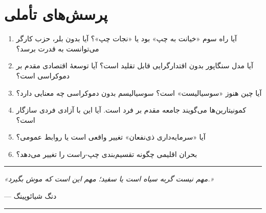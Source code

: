 \section*{پرسش‌های تأملی}

\begin{tcolorbox}[
    enhanced,
    colback=centergreen!8,
    colframe=centergreen,
    boxrule=1.5pt,
    arc=5pt,
    fonttitle=\bfseries,
    title={\rl{❓ پرسش‌هایی برای تأمل و بحث}}
]
\begin{enumerate}
    \item آیا راه سوم «خیانت به چپ» بود یا «نجات چپ»؟ آیا بدون بلر، حزب کارگر می‌توانست به قدرت برسد؟
    
    \item آیا مدل سنگاپور بدون اقتدارگرایی قابل تقلید است؟ آیا توسعهٔ اقتصادی مقدم بر دموکراسی است؟
    
    \item آیا چین هنوز «سوسیالیست» است؟ سوسیالیسم بدون دموکراسی چه معنایی دارد؟
    
    \item کمونیتارین‌ها می‌گویند جامعه مقدم بر فرد است. آیا این با آزادی فردی سازگار است؟
    
    \item آیا «سرمایه‌داری ذی‌نفعان» تغییر واقعی است یا روابط عمومی؟
    
    \item بحران اقلیمی چگونه تقسیم‌بندی چپ-راست را تغییر می‌دهد؟
\end{enumerate}
\end{tcolorbox}

\vspace{10mm}
\begin{center}
\rule{0.6\textwidth}{1pt}

\vspace{3mm}
\textit{«مهم نیست گربه سیاه است یا سفید؛ مهم این است که موش بگیرد.»}

\vspace{2mm}
--- دنگ شیائوپینگ

\vspace{3mm}
\rule{0.6\textwidth}{1pt}
\end{center}